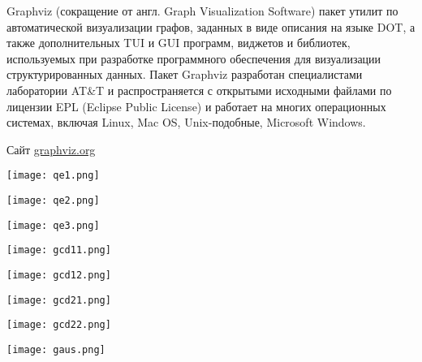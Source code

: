 \documentclass[10pt,utf8,presentation,notheorems,xcolor=dvipsnames,compress]{beamer}
\begin{document}
\begin{frame}
\begin{block}{Graphviz (сокращение от англ. Graph Visualization Software)}
пакет утилит по автоматической визуализации графов, заданных в виде описания на 
языке DOT, а также дополнительных TUI и GUI программ, виджетов и библиотек, 
используемых при разработке программного обеспечения для визуализации 
структурированных данных. Пакет Graphviz разработан специалистами лаборатории 
AT\&T и распространяется с открытыми исходными файлами по лицензии EPL (Eclipse 
Public License) и работает на многих операционных системах, включая Linux, Mac 
OS, Unix-подобные, Microsoft Windows.
\end{block}

\begin{center}
Сайт \href{http://graphviz.org/}{graphviz.org}
\end{center}
\end{frame}

\begin{frame}
\texttt{[image: qe1.png]}
\end{frame}

\begin{frame}
\texttt{[image: qe2.png]}
\end{frame}

\begin{frame}
\texttt{[image: qe3.png]}
\end{frame}

\begin{frame}
\texttt{[image: gcd11.png]}
\end{frame}

\begin{frame}
\texttt{[image: gcd12.png]}
\end{frame}

\begin{frame}
\texttt{[image: gcd21.png]}
\end{frame}

\begin{frame}
\texttt{[image: gcd22.png]}
\end{frame}

\begin{frame}
\texttt{[image: gaus.png]}
\end{frame}
\end{document}
